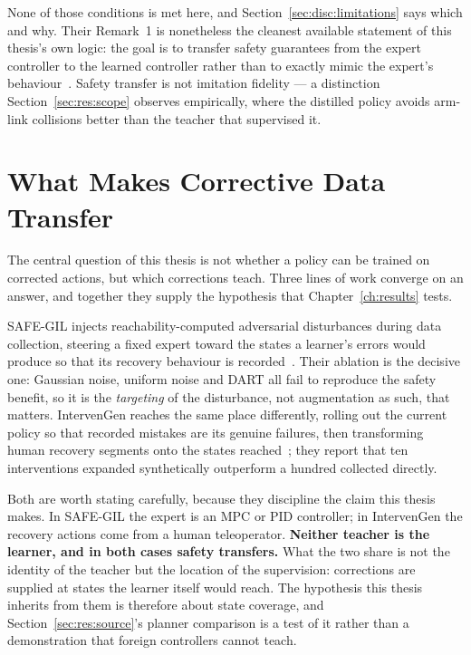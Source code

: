None of those conditions is met here, and Section~\ref{sec:disc:limitations} says which and why.
Their Remark~1 is nonetheless the cleanest available statement of this thesis's own logic: the goal
is to transfer safety guarantees from the expert controller to the learned controller rather than
to exactly mimic the expert's behaviour~\cite{cosner2022il_cbf}. Safety transfer is not imitation
fidelity --- a distinction Section~\ref{sec:res:scope} observes empirically, where the distilled
policy avoids arm-link collisions better than the teacher that supervised it.

\section{What Makes Corrective Data Transfer}\label{sec:bg:corrective}

The central question of this thesis is not whether a policy can be trained on corrected actions,
but which corrections teach. Three lines of work converge on an answer, and together they supply
the hypothesis that Chapter~\ref{ch:results} tests.

SAFE-GIL injects reachability-computed adversarial disturbances during data collection, steering a
fixed expert toward the states a learner's errors would produce so that its recovery behaviour is
recorded~\cite{ciftci2025safegil}. Their ablation is the decisive one: Gaussian noise, uniform
noise and DART all fail to reproduce the safety benefit, so it is the \emph{targeting} of the
disturbance, not augmentation as such, that matters. IntervenGen reaches the same place
differently, rolling out the current policy so that recorded mistakes are its genuine failures,
then transforming human recovery segments onto the states reached~\cite{hoque2024intervengen};
they report that ten interventions expanded synthetically outperform a hundred collected directly.

Both are worth stating carefully, because they discipline the claim this thesis makes. In SAFE-GIL
the expert is an MPC or PID controller; in IntervenGen the recovery actions come from a human
teleoperator. \textbf{Neither teacher is the learner, and in both cases safety transfers.} What the
two share is not the identity of the teacher but the location of the supervision: corrections are
supplied at states the learner itself would reach. The hypothesis this thesis inherits from them is
therefore about state coverage, and Section~\ref{sec:res:source}'s planner comparison is a test of
it rather than a demonstration that foreign controllers cannot teach.

